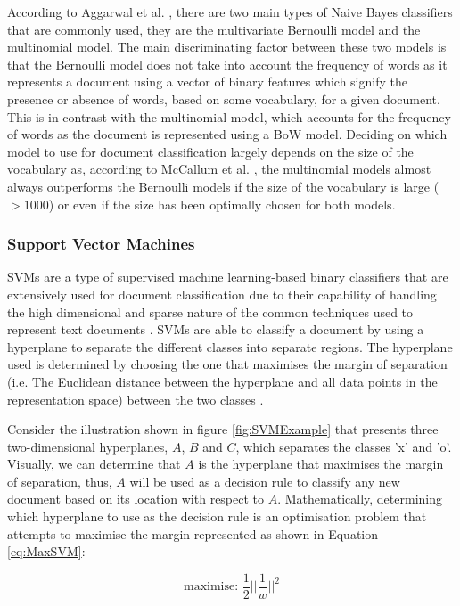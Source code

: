 \documentclass[a4paper,twoside,phd]{BYUPhys}
\begin{document}
According to Aggarwal et al. \cite{Aggarwal2012}, there are two main types of Naive Bayes classifiers that are commonly used, they are the multivariate Bernoulli model and the multinomial model. The main discriminating factor between these two models is that the Bernoulli model does not take into account the frequency of words as it represents a document using a vector of binary features which signify the presence or absence of words, based on some vocabulary, for a given document. This is in contrast with the multinomial model, which accounts for the frequency of words as the document is represented using a BoW model. Deciding on which model to use for document classification largely depends on the size of the vocabulary as, according to McCallum et al. \cite{McCallum1998}, the multinomial models almost always outperforms the Bernoulli models if the size of the vocabulary is large ($> 1000$) or even if the size has been optimally chosen for both models.

\subsubsection{Support Vector Machines}
\label{sec:SVM}

SVMs are a type of supervised machine learning-based binary classifiers that are extensively used for document classification due to their capability of handling the high dimensional and sparse nature of the common techniques used to represent text documents \cite{Informatik1997}. SVMs are able to classify a document by using a hyperplane to separate the different classes into separate regions. The hyperplane used is determined by choosing the one that maximises the margin of separation (i.e. The Euclidean distance between the hyperplane and all data points in the representation space) between the two classes \cite{Aggarwal2012}.

Consider the illustration shown in figure \ref{fig:SVMExample} that presents three  two-dimensional hyperplanes, $A$, $B$ and $C$, which separates the classes 'x' and 'o'. Visually, we can determine that $A$ is the hyperplane that maximises the margin of separation, thus, $A$ will be used as a decision rule to classify any new document based on its location with respect to $A$. Mathematically, determining which hyperplane to use as the decision rule is an optimisation problem that attempts to maximise the margin represented as shown in Equation \ref{eq:MaxSVM}:

\begin{equation}
\text{maximise: } \frac{1}{2}||\frac{1}{w}||^2
\label{eq:MaxSVM}
\end{equation}
\end{document}
